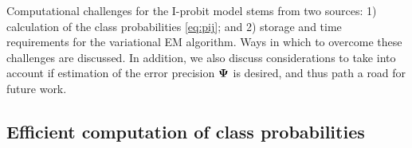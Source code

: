 Computational challenges for the I-probit model stems from two sources: 1) calculation of the class probabilities \cref{eq:pij}; and 2) storage and time requirements for the variational EM algorithm.
Ways in which to overcome these challenges are discussed.
In addition, we also discuss considerations to take into account if estimation of the error precision ${\bm\Psi}$ is desired, and thus path a road for future work.

\subsection{Efficient computation of class probabilities}
\label{sec:mnint}


